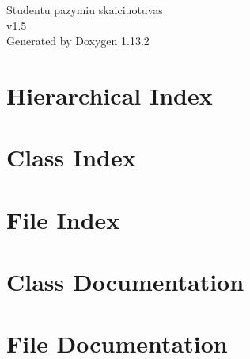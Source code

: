 \documentclass[twoside]{book}
\newcommand{\+}{\discretionary{\mbox{\scriptsize$\hookleftarrow$}}{}{}}
\newcommand{\clearemptydoublepage}{%
    \newpage{\pagestyle{empty}\cleardoublepage}%
  }
\begin{document}
  \raggedbottom
    \hypersetup{pageanchor=false,
                bookmarksnumbered=true,
                pdfencoding=unicode
               }
  \begin{titlepage}
  \vspace*{7cm}
  \begin{center}%
  {\Large Studentu pazymiu skaiciuotuvas}\\
  [1ex]\large v1.\+5 \\
  \vspace*{1cm}
  {\large Generated by Doxygen 1.13.2}\\
  \end{center}
  \end{titlepage}
  \clearemptydoublepage
  \tableofcontents
  \clearemptydoublepage
  \hypersetup{pageanchor=true}

\chapter{Hierarchical Index}

\chapter{Class Index}

\chapter{File Index}

\chapter{Class Documentation}


\chapter{File Documentation}


  \backmatter
  \newpage
  \clearemptydoublepage
  \printindex
\end{document}
